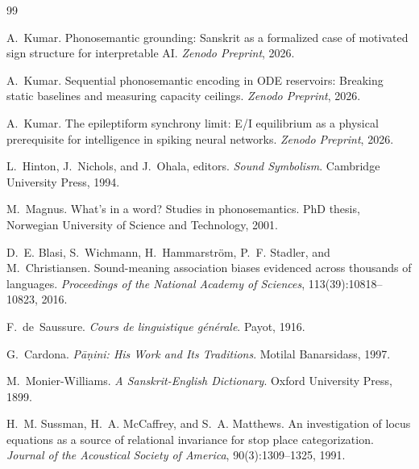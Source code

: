 \documentclass{article}
\begin{document}
\begin{thebibliography}{99}

A.~Kumar.
\newblock Phonosemantic grounding: {S}anskrit as a formalized case of
  motivated sign structure for interpretable {AI}.
\newblock \textit{Zenodo Preprint}, 2026.
\newblock {}

A.~Kumar.
\newblock Sequential phonosemantic encoding in {ODE} reservoirs: Breaking
  static baselines and measuring capacity ceilings.
\newblock \textit{Zenodo Preprint}, 2026.
\newblock {}

A.~Kumar.
\newblock The epileptiform synchrony limit: {E/I} equilibrium as a physical
  prerequisite for intelligence in spiking neural networks.
\newblock \textit{Zenodo Preprint}, 2026.
\newblock {}

L.~Hinton, J.~Nichols, and J.~Ohala, editors.
\newblock \textit{Sound Symbolism}.
\newblock Cambridge University Press, 1994.

M.~Magnus.
\newblock What's in a word? {S}tudies in phonosemantics.
\newblock PhD thesis, Norwegian University of Science and Technology, 2001.

D.~E. Blasi, S.~Wichmann, H.~Hammarstr{\"o}m, P.~F. Stadler, and
  M.~Christiansen.
\newblock Sound-meaning association biases evidenced across thousands of
  languages.
\newblock \textit{Proceedings of the National Academy of Sciences},
  113(39):10818--10823, 2016.

F.~de~Saussure.
\newblock \textit{Cours de linguistique g{\'e}n{\'e}rale}.
\newblock Payot, 1916.

G.~Cardona.
\newblock \textit{P{\={a}}{\d{n}}ini: His Work and Its Traditions}.
\newblock Motilal Banarsidass, 1997.

M.~Monier-Williams.
\newblock \textit{A Sanskrit-English Dictionary}.
\newblock Oxford University Press, 1899.

H.~M. Sussman, H.~A. McCaffrey, and S.~A. Matthews.
\newblock An investigation of locus equations as a source of relational
  invariance for stop place categorization.
\newblock \textit{Journal of the Acoustical Society of America},
  90(3):1309--1325, 1991.


\end{thebibliography}
\end{document}
